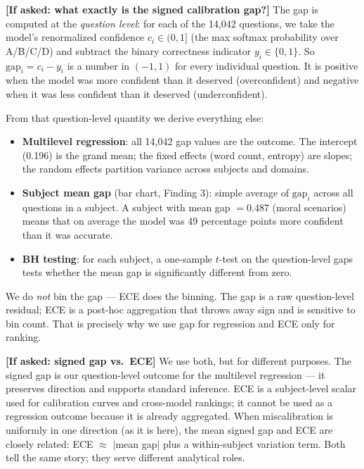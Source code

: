 \documentclass[aspectratio=169,11pt]{beamer}
\begin{document}
{  \textbf{[If asked: what exactly is the signed calibration gap?]}
  The gap is computed at the \emph{question level}: for each of the 14,042 questions,
  we take the model's renormalized confidence $c_i \in (0,1]$ (the max softmax
  probability over A/B/C/D) and subtract the binary correctness indicator $y_i \in \{0,1\}$.
  So $\mathrm{gap}_i = c_i - y_i$ is a number in $(-1, 1)$ for every individual question.
  It is positive when the model was more confident than it deserved (overconfident)
  and negative when it was less confident than it deserved (underconfident).

  From that question-level quantity we derive everything else:
  \begin{itemize}
    \item \textbf{Multilevel regression}: all 14,042 gap values are the outcome.
      The intercept (0.196) is the grand mean; the fixed effects (word count, entropy)
      are slopes; the random effects partition variance across subjects and domains.
    \item \textbf{Subject mean gap} (bar chart, Finding 3): simple average of
      $\mathrm{gap}_i$ across all questions in a subject. A subject with mean gap
      $= 0.487$ (moral scenarios) means that on average the model was 49 percentage
      points more confident than it was accurate.
    \item \textbf{BH testing}: for each subject, a one-sample $t$-test on the
      question-level gaps tests whether the mean gap is significantly different
      from zero.
  \end{itemize}
  We do \emph{not} bin the gap — ECE does the binning. The gap is a raw question-level
  residual; ECE is a post-hoc aggregation that throws away sign and is sensitive to
  bin count. That is precisely why we use gap for regression and ECE only for ranking.

  \textbf{[If asked: signed gap vs.\ ECE]}
  We use both, but for different purposes. The signed gap is our question-level outcome
  for the multilevel regression — it preserves direction and supports standard inference.
  ECE is a subject-level scalar used for calibration curves and cross-model rankings;
  it cannot be used as a regression outcome because it is already aggregated.
  When miscalibration is uniformly in one direction (as it is here), the mean signed
  gap and ECE are closely related: ECE $\approx$ $|$mean gap$|$ plus a within-subject
  variation term. Both tell the same story; they serve different analytical roles.

}
\end{document}
